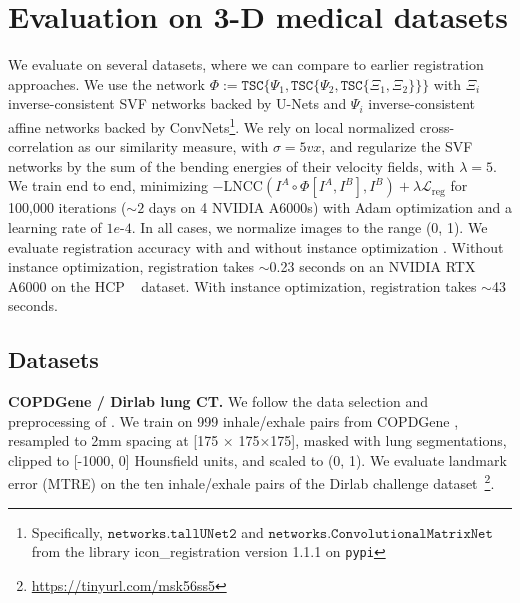 \section{Evaluation on 3-D medical datasets}

We evaluate on several datasets, where we can compare to earlier registration
approaches. We use the network $\Phi := \texttt{TSC}\{\Psi_1,
	\texttt{TSC}\{\Psi_2, \texttt{TSC}\{\Xi_1, \Xi_2\}\}\}$ with $\Xi_i$
inverse-consistent SVF networks backed by U-Nets and $\Psi_i$
inverse-consistent affine networks backed by ConvNets\footnote{Specifically,
	$\texttt{networks.tallUNet2}$ and $\texttt{networks.ConvolutionalMatrixNet}$
	from the library icon\_registration version 1.1.1 on \texttt{pypi}}. We rely
on local normalized cross-correlation as our similarity measure, with $\sigma=5vx$, and regularize the SVF networks by the sum of the bending energies of their
velocity fields, with $\lambda=5$. We train end to end, minimizing
$-\text{LNCC}(I^A \circ \Phi[I^A, I^B], I^B) +
	\lambda\mathcal{L}_\text{reg}$ for 100,000 iterations ($\sim2$ days on 4 NVIDIA A6000s) with Adam
optimization and a learning rate of $1e$-$4$. In all cases, we normalize
images to the range (0, 1). We evaluate registration accuracy with and without
instance optimization \cite{wang2022plosl,lin2022GradICON}. Without instance
optimization, registration takes $\sim$0.23 seconds on an NVIDIA RTX A6000 on
the HCP ~\cite{van2012human} dataset. With instance optimization, registration
takes $\sim$43 seconds.

\subsection{Datasets}

\textbf{COPDGene / Dirlab lung CT.} We follow the data selection and preprocessing of \cite{lin2022GradICON}. We
train on 999 inhale/exhale pairs from COPDGene \cite{regan2011genetic}, resampled to 2mm spacing at [175 $\times$ 175$\times$175], masked
with lung segmentations, clipped to [-1000, 0] Hounsfield units, and scaled to
(0, 1). We evaluate landmark error (MTRE) on the ten inhale/exhale pairs
of the Dirlab challenge dataset~\cite{castillo2013reference}\footnote{\url{https://tinyurl.com/msk56ss5}}.


